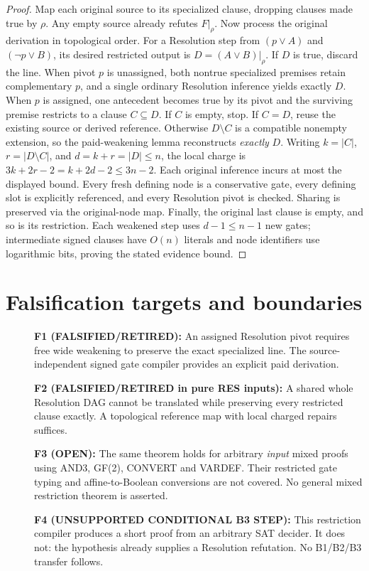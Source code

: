 \documentclass[11pt]{article}
\begin{document}
\begin{proof}
Map each original source to its specialized clause, dropping clauses made true by $\rho$. Any empty source already refutes $F|_\rho$. Now process the original derivation in topological order. For a Resolution step from $(p\vee A)$ and $(\neg p\vee B)$, its desired restricted output is $D=(A\vee B)|_\rho$. If $D$ is true, discard the line. When pivot $p$ is unassigned, both nontrue specialized premises retain complementary $p$, and a single ordinary Resolution inference yields exactly $D$. When $p$ is assigned, one antecedent becomes true by its pivot and the surviving premise restricts to a clause $C\subseteq D$. If $C$ is empty, stop. If $C=D$, reuse the existing source or derived reference. Otherwise $D\setminus C$ is a compatible nonempty extension, so the paid-weakening lemma reconstructs \emph{exactly} $D$. Writing $k=|C|$, $r=|D\setminus C|$, and $d=k+r=|D|\le n$, the local charge is $3k+2r-2=k+2d-2\le3n-2$. Each original inference incurs at most the displayed bound. Every fresh defining node is a conservative gate, every defining slot is explicitly referenced, and every Resolution pivot is checked. Sharing is preserved via the original-node map. Finally, the original last clause is empty, and so is its restriction. Each weakened step uses $d-1\le n-1$ new gates; intermediate signed clauses have $O(n)$ literals and node identifiers use logarithmic bits, proving the stated evidence bound.
\end{proof}

\section*{Falsification targets and boundaries}
\begin{description}
\item[] \textbf{F1 (FALSIFIED/RETIRED):} An assigned Resolution pivot requires free wide weakening to preserve the exact specialized line. The source-independent signed gate compiler provides an explicit paid derivation.
\item[] \textbf{F2 (FALSIFIED/RETIRED in pure RES inputs):} A shared whole Resolution DAG cannot be translated while preserving every restricted clause exactly. A topological reference map with local charged repairs suffices.
\item[] \textbf{F3 (OPEN):} The same theorem holds for arbitrary \emph{input} mixed proofs using AND3, GF(2), CONVERT and VARDEF. Their restricted gate typing and affine-to-Boolean conversions are not covered. No general mixed restriction theorem is asserted.
\item[] \textbf{F4 (UNSUPPORTED CONDITIONAL B3 STEP):} This restriction compiler produces a short proof from an arbitrary SAT decider. It does not: the hypothesis already supplies a Resolution refutation. No B1/B2/B3 transfer follows.
\end{description}
\end{document}
